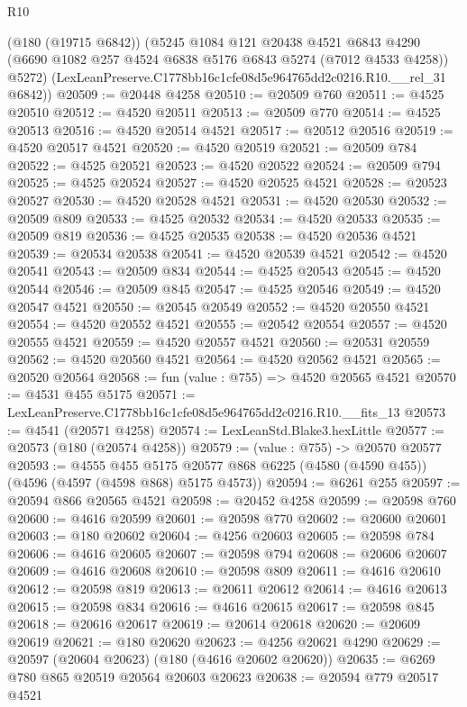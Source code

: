 \begin{lexlean}{R10}
\begin{coremodule}
      (@180 (@19715 @6842))
      (@5245
        @1084
        @121
        @20438
        @4521
        @6843
        @4290
        (@6690 @1082 @257 @4524 @6838 @5176 @6843 @5274 (@7012 @4533 @4258))
        @5272)
      (LexLeanPreserve.C1778bb16c1cfe08d5e964765dd2c0216.R10.__rel_31 @6842))
@20509 := @20448 @4258
@20510 := @20509 @760
@20511 := @4525 @20510
@20512 := @4520 @20511
@20513 := @20509 @770
@20514 := @4525 @20513
@20516 := @4520 @20514 @4521
@20517 := @20512 @20516
@20519 := @4520 @20517 @4521
@20520 := @4520 @20519
@20521 := @20509 @784
@20522 := @4525 @20521
@20523 := @4520 @20522
@20524 := @20509 @794
@20525 := @4525 @20524
@20527 := @4520 @20525 @4521
@20528 := @20523 @20527
@20530 := @4520 @20528 @4521
@20531 := @4520 @20530
@20532 := @20509 @809
@20533 := @4525 @20532
@20534 := @4520 @20533
@20535 := @20509 @819
@20536 := @4525 @20535
@20538 := @4520 @20536 @4521
@20539 := @20534 @20538
@20541 := @4520 @20539 @4521
@20542 := @4520 @20541
@20543 := @20509 @834
@20544 := @4525 @20543
@20545 := @4520 @20544
@20546 := @20509 @845
@20547 := @4525 @20546
@20549 := @4520 @20547 @4521
@20550 := @20545 @20549
@20552 := @4520 @20550 @4521
@20554 := @4520 @20552 @4521
@20555 := @20542 @20554
@20557 := @4520 @20555 @4521
@20559 := @4520 @20557 @4521
@20560 := @20531 @20559
@20562 := @4520 @20560 @4521
@20564 := @4520 @20562 @4521
@20565 := @20520 @20564
@20568 := fun (value : @755) => @4520 @20565 @4521
@20570 := @4531 @455 @5175
@20571 := LexLeanPreserve.C1778bb16c1cfe08d5e964765dd2c0216.R10.__fits_13
@20573 := @4541 (@20571 @4258)
@20574 := LexLeanStd.Blake3.hexLittle
@20577 := @20573 (@180 (@20574 @4258))
@20579 := (value : @755) -> @20570 @20577
@20593 := @4555
    @455
    @5175
    @20577
    @868
    @6225
    (@4580 (@4590 @455))
    (@4596 (@4597 (@4598 @868) @5175 @4573))
@20594 := @6261 @255
@20597 := @20594 @866 @20565 @4521
@20598 := @20452 @4258
@20599 := @20598 @760
@20600 := @4616 @20599
@20601 := @20598 @770
@20602 := @20600 @20601
@20603 := @180 @20602
@20604 := @4256 @20603
@20605 := @20598 @784
@20606 := @4616 @20605
@20607 := @20598 @794
@20608 := @20606 @20607
@20609 := @4616 @20608
@20610 := @20598 @809
@20611 := @4616 @20610
@20612 := @20598 @819
@20613 := @20611 @20612
@20614 := @4616 @20613
@20615 := @20598 @834
@20616 := @4616 @20615
@20617 := @20598 @845
@20618 := @20616 @20617
@20619 := @20614 @20618
@20620 := @20609 @20619
@20621 := @180 @20620
@20623 := @4256 @20621 @4290
@20629 := @20597 (@20604 @20623) (@180 (@4616 @20602 @20620))
@20635 := @6269 @780 @865 @20519 @20564 @20603 @20623
@20638 := @20594 @779 @20517 @4521

\end{coremodule}
\end{lexlean}
